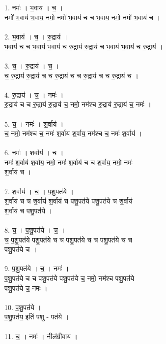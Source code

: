 \subsection{}
1. नमः॑ । भ॒वाय॑ । च॒ ।\\
नमो॑ भ॒वाय॑ भ॒वाय॒ नमो॒ नमो॑ भ॒वाय॑ च च भ॒वाय॒ नमो॒ नमो॑ भ॒वाय॑ च ।\\
\\
2. भ॒वाय॑ । च॒ । रु॒द्राय॑ ।\\
भ॒वाय॑ च च भ॒वाय॑ भ॒वाय॑ च रु॒द्राय॑ रु॒द्राय॑ च भ॒वाय॑ भ॒वाय॑ च रु॒द्राय॑ ।\\
\\
3. च॒ । रु॒द्राय॑ । च॒ ।\\
च॒ रु॒द्राय॑ रु॒द्राय॑ च च रु॒द्राय॑ च च रु॒द्राय॑ च च रु॒द्राय॑ च ।\\
\\
4. रु॒द्राय॑ । च॒ । नमः॑ ।\\
रु॒द्राय॑ च च रु॒द्राय॑ रु॒द्राय॑ च॒ नमो॒ नम॑श्च रु॒द्राय॑ रु॒द्राय॑ च॒ नमः॑ ।\\
\\
5. च॒ । नमः॑ । श॒र्वाय॑ ।\\
च॒ नमो॒ नम॑श्च च॒ नमः॑ श॒र्वाय॑ श॒र्वाय॒ नम॑श्च च॒ नमः॑ श॒र्वाय॑ ।\\
\\
6. नमः॑ । श॒र्वाय॑ । च॒ ।\\
नमः॑ श॒र्वाय॑ श॒र्वाय॒ नमो॒ नमः॑ श॒र्वाय॑ च च श॒र्वाय॒ नमो॒ नमः॑\\
श॒र्वाय॑ च ।\\
\\
7. श॒र्वाय॑ । च॒ । प॒शु॒पत॑ये ।\\
श॒र्वाय॑ च च श॒र्वाय॑ श॒र्वाय॑ च पशु॒पत॑ये पशु॒पत॑ये च श॒र्वाय॑\\
श॒र्वाय॑ च पशु॒पत॑ये ।\\
\\
8. च॒ । प॒शु॒पत॑ये । च॒ ।\\
च॒ प॒शु॒पत॑ये पशु॒पत॑ये च च पशु॒पत॑ये च च पशु॒पत॑ये च च\\
पशु॒पत॑ये च ।\\
\\
9. प॒शु॒पत॑ये । च॒ । नमः॑ ।\\
प॒शु॒पत॑ये च च पशु॒पत॑ये पशु॒पत॑ये च॒ नमो॒ नम॑श्च पशु॒पत॑ये\\
पशु॒पत॑ये च॒ नमः॑ ।\\
\\
10. प॒शु॒पत॑ये ।\\
प॒शु॒पत॑य॒ इति॑ पशु - पत॑ये ।\\
\\
11. च॒ । नमः॑ । नील॑ग्रीवाय ।\\
